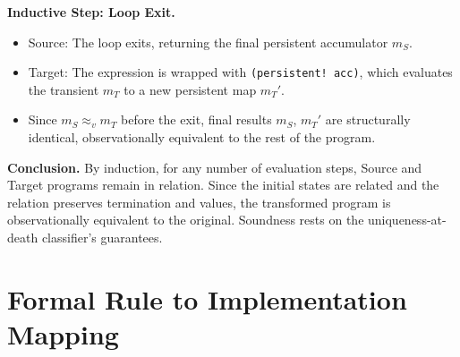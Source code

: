 \documentclass[sigplan,review,anonymous]{acmart}
\begin{document}
\textbf{Inductive Step: Loop Exit.}
\begin{itemize}
    \item Source: The loop exits, returning the final persistent accumulator $m_S$.
    \item Target: The expression is wrapped with \texttt{(persistent! acc)}, which evaluates the transient $m_T$ to a new persistent map $m_T'$.
    \item Since $m_S \approx_v m_T$ before the exit, final results $m_S$, $m_T'$ are structurally identical, observationally equivalent to the rest of the program.
\end{itemize}

\textbf{Conclusion.} By induction, for any number of evaluation steps, Source and Target programs remain in relation. Since the initial states are related and the relation preserves termination and values, the transformed program is observationally equivalent to the original. Soundness rests on the uniqueness-at-death classifier's guarantees.

\section{Formal Rule to Implementation Mapping}
\label{app:fidelity}
\end{document}
